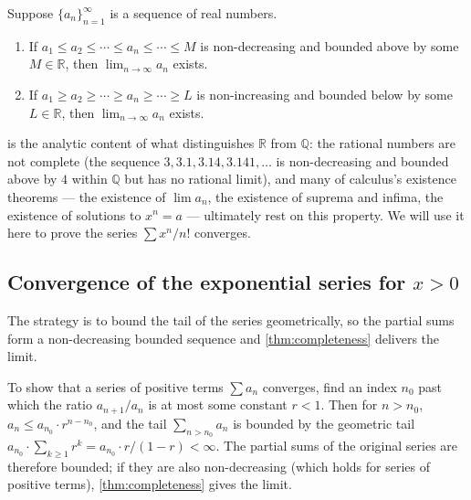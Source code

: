 \begin{theorem}[Completeness]\label{thm:completeness}
Suppose \(\{a_{n}\}_{n = 1}^{\infty}\) is a sequence of real numbers.
\begin{enumerate}
    \item If \(a_{1} \leq a_{2} \leq \dotsb \leq a_{n} \leq \dotsb \leq M\) is non-decreasing and bounded above by some \(M \in \mathbb{R}\), then \(\lim_{n \to \infty} a_{n}\) exists.
    \item If \(a_{1} \geq a_{2} \geq \dotsb \geq a_{n} \geq \dotsb \geq L\) is non-increasing and bounded below by some \(L \in \mathbb{R}\), then \(\lim_{n \to \infty} a_{n}\) exists.
\end{enumerate}
\end{theorem}

\begin{remark}
 is the analytic content of what distinguishes \(\mathbb{R}\) from \(\mathbb{Q}\): the rational numbers are not complete (the sequence \(3, 3.1, 3.14, 3.141, \dots\) is non-decreasing and bounded above by \(4\) within \(\mathbb{Q}\) but has no rational limit), and many of calculus's existence theorems --- the existence of \(\lim a_{n}\), the existence of suprema and infima, the existence of solutions to \(x^{n} = a\) --- ultimately rest on this property. We will use it here to prove the series \(\sum x^{n}/n!\) converges.
\end{remark}

\subsection{Convergence of the exponential series for \texorpdfstring{$x > 0$}{x > 0}}

The strategy is to bound the tail of the series geometrically, so the partial sums form a non-decreasing bounded sequence and \cref{thm:completeness} delivers the limit.

\begin{strategy}
To show that a series of positive terms \(\sum a_{n}\) converges, find an index \(n_{0}\) past which the ratio \(a_{n + 1}/a_{n}\) is at most some constant \(r < 1\). Then for \(n > n_{0}\), \(a_{n} \leq a_{n_{0}} \cdot r^{n - n_{0}}\), and the tail \(\sum_{n > n_{0}} a_{n}\) is bounded by the geometric tail \(a_{n_{0}} \cdot \sum_{k \geq 1} r^{k} = a_{n_{0}} \cdot r/(1 - r) < \infty\). The partial sums of the original series are therefore bounded; if they are also non-decreasing (which holds for series of positive terms), \cref{thm:completeness} gives the limit.
\end{strategy}

